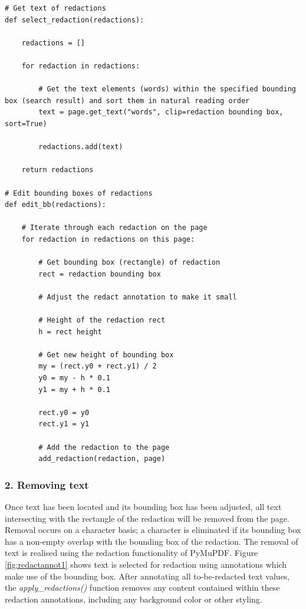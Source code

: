 \begin{lstlisting}[style=CStyle, caption=Pseudocode for labelling of text and the selection of the labels using PyMuPDF. Size of the bounding box is made smaller to prevent redaction of more than only the to-be-redacted text. This is an improvement of the original functionality of PyMuPDF which is prone to redacting more text than requested.]
# Get text of redactions
def select_redaction(redactions):

    redactions = []
    
    for redaction in redactions:
    
        # Get the text elements (words) within the specified bounding box (search result) and sort them in natural reading order
        text = page.get_text("words", clip=redaction bounding box, sort=True)
        
        redactions.add(text)

    return redactions

# Edit bounding boxes of redactions
def edit_bb(redactions):

    # Iterate through each redaction on the page
    for redaction in redactions on this page:
    
        # Get bounding box (rectangle) of redaction
        rect = redaction bounding box
    
        # Adjust the redact annotation to make it small
        
        # Height of the redaction rect
        h = rect height
        
        # Get new height of bounding box
        my = (rect.y0 + rect.y1) / 2 
        y0 = my - h * 0.1
        y1 = my + h * 0.1
        
        rect.y0 = y0
        rect.y1 = y1
    
        # Add the redaction to the page
        add_redaction(redaction, page)
\end{lstlisting}

\subsubsection{2. Removing text}
Once text has been located and its bounding box has been adjusted, all text intersecting with the rectangle of the redaction will be removed from the page. Removal occurs on a character basis; a character is eliminated if its bounding box has a non-empty overlap with the bounding box of the redaction. The removal of text is realised using the redaction functionality of PyMuPDF. Figure \ref{fig:redactannot1} shows text is selected for redaction using annotations which make use of the bounding box. After annotating all to-be-redacted text values, the \textit{apply\_redactions()} function removes any content contained within these redaction annotations, including any background color or other styling.

